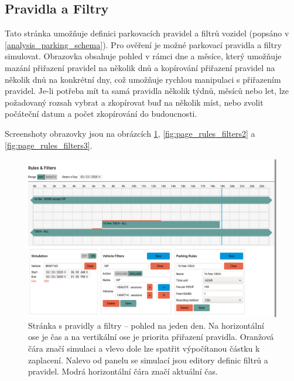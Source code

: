 \subsection{Pravidla a Filtry}

\noindent
Tato stránka umožňuje definici parkovacích pravidel a filtrů vozidel (popsáno v \ref{analysis_parking_schema}).
Pro ověření je možné parkovací pravidla a filtry simulovat.
Obrazovka obsahuje pohled v rámci dne a měsíce, který umožňuje mazání přiřazení pravidel na několik dnů a
kopírování přiřazení pravidel na několik dnů na konkrétní dny, což umožňuje rychlou manipulaci
s přiřazením pravidel.
Je-li potřeba mít ta samá pravidla několik týdnů, měsíců nebo let, lze požadovaný rozsah vybrat
a zkopírovat buď na několik míst, nebo zvolit počáteční datum a počet zkopírování do budoucnosti.

Screenshoty obrazovky jsou na obrázcích \ref{fig:page_rules_filters1}, \ref{fig:page_rules_filters2} a \ref{fig:page_rules_filters3}.

\begin{figure}[htb!] \centering
  \includegraphics[width=145mm]{../img/page_rules_filters1.png}
  \caption[Stránka s pravidly a filtry -- pohled na jeden den.]{Stránka s pravidly a filtry -- pohled na jeden den.
  Na horizontální ose je čas a na vertikální ose je priorita přiřazení pravidla. Oranžová čára značí simulaci a vlevo
  dole lze spatřit výpočítanou částku k zaplacení. Nalevo od panelu se simulací jsou editory definic filtrů
  a pravidel. Modrá horizontální čára značí aktuální čas.}
  \label{fig:page_rules_filters1}
\end{figure}

